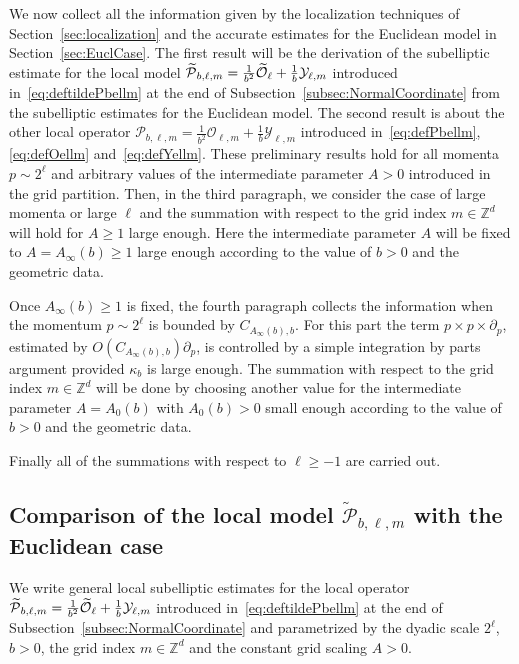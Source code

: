 \documentclass[AHL,Unicode,longabstracts]{cedram}
\newcommand{\Z}{\mathbb{Z}}
\newcommand{\clY}{\mathcal{Y}}
\newcommand{\clO}{\mathcal{O}}
\newcommand{\clP}{\mathcal{P}}
\let\oldtilde\tilde
\renewcommand*{\tilde}[1]{\mathchoice{\widetilde{#1}}{\widetilde{#1}}{\oldtilde{#1}}{\oldtilde{#1}}}
\begin{document}
We now collect all the information given by the localization techniques of Section~\ref{sec:localization} and the accurate estimates for the Euclidean model in Section~\ref{sec:EuclCase}. The first result will be the derivation of the subelliptic estimate for the local model $\tilde{\clP}_{b,\ell,m}=\frac{1}{b^2}\tilde{\clO}_{\ell}+\frac{1}{b}\clY_{\ell,m}$ introduced in~\eqref{eq:deftildePbellm} at the end of Subsection~\ref{subsec:NormalCoordinate} from the subelliptic estimates for the Euclidean model. The second result is about the other local operator $\clP_{b,\ell,m}=\frac{1}{b^2}\clO_{\ell,m}+\frac{1}{b}\clY_{\ell,m}$ introduced in~\eqref{eq:defPbellm}, \eqref{eq:defOellm} and~\eqref{eq:defYellm}. These preliminary results hold for all momenta $p\sim 2^{\ell}$ and arbitrary values of the intermediate parameter $A>0$ introduced in the grid partition. Then, in the third paragraph, we consider the case of large momenta or large $\ell$ and the summation with respect to the grid index $m\in\Z^d$ will hold for $A\geq 1$ large enough. Here the intermediate parameter $A$ will be fixed to $A=A_{\infty}(b)\geq 1$ large enough according to the value of $b>0$ and the geometric data.

Once $A_\infty(b)\geq 1$ is fixed, the fourth paragraph collects the information when the momentum $p\sim 2^{\ell}$ is bounded by $C_{A_\infty(b),b}$. For this part the term $p\times p\times \partial_p$, estimated by $O(C_{A_\infty(b),b})\partial_p$, is controlled by a simple integration by parts argument provided $\kappa_b$ is large enough. The summation with respect to the grid index $m\in\Z^d$ will be done by choosing another value for the intermediate parameter $A=A_0(b)$ with $A_0(b)>0$ small enough according to the value of $b>0$ and the geometric data.

Finally all of the summations with respect to $\ell\geq -1$ are carried out.

\subsection{Comparison of the local model \texorpdfstring{$\widetilde{\clP}_{b,\ell,m}$}{P\_b,l,m} with the Euclidean case}\label{sec:localtPbellm}

We write general local subelliptic estimates for the local operator $\tilde{\clP}_{b,\ell,m}=\frac{1}{b^2}\tilde{\clO}_{\ell}+\frac{1}{b}\clY_{\ell,m}$ introduced in~\eqref{eq:deftildePbellm} at the end of Subsection~\ref{subsec:NormalCoordinate} and parametrized by the dyadic scale $2^{\ell}$, $b>0$, the grid index $m\in \Z^d$ and the constant grid scaling $A>0$.
\end{document}
